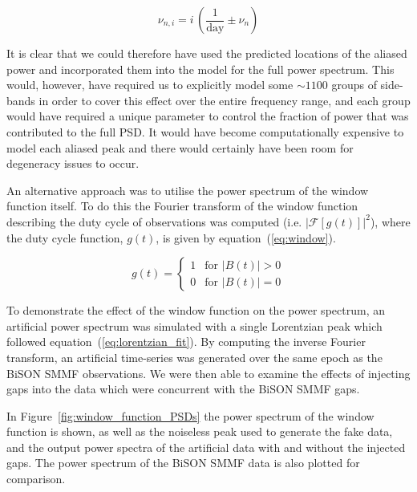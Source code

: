 \begin{equation}
\nu_{n, i} = i \, (\frac{1}{\mathrm{day}} \pm \nu_{n})
\label{eq:sidebands}
\end{equation}

It is clear that we could therefore have used the predicted locations of the aliased power and incorporated them into the model for the full power spectrum. This would, however, have required us to explicitly model some $\sim 1100$ groups of side-bands in order to cover this effect over the entire frequency range, and each group would have required a unique parameter to control the fraction of power that was contributed to the full PSD. It would have become computationally expensive to model each aliased peak and there would certainly have been room for degeneracy issues to occur.

An alternative approach was to utilise the power spectrum of the window function itself. To do this the Fourier transform of the window function describing the duty cycle of observations was computed (i.e. $\left|\mathcal{F}\left[g(t)\right]\right|^2$), where the duty cycle function, $g(t)$, is given by equation~(\ref{eq:window}).

\begin{equation}
g(t) = 
\begin{cases} 
1 & \text{for } |B(t)| > 0 \\
0       & \text{for } |B(t)| = 0
\end{cases}
\label{eq:window}
\end{equation}

To demonstrate the effect of the window function on the power spectrum, an artificial power spectrum was simulated with a single Lorentzian peak which followed equation~(\ref{eq:lorentzian_fit}). By computing the inverse Fourier transform, an artificial time-series was generated over the same epoch as the BiSON SMMF observations. We were then able to examine the effects of injecting gaps into the data which were concurrent with the BiSON SMMF gaps. 

In Figure~\ref{fig:window_function_PSDs} the power spectrum of the window function is shown, as well as the noiseless peak used to generate the fake data, and the output power spectra of the artificial data with and without the injected gaps. The power spectrum of the BiSON SMMF data is also plotted for comparison.




